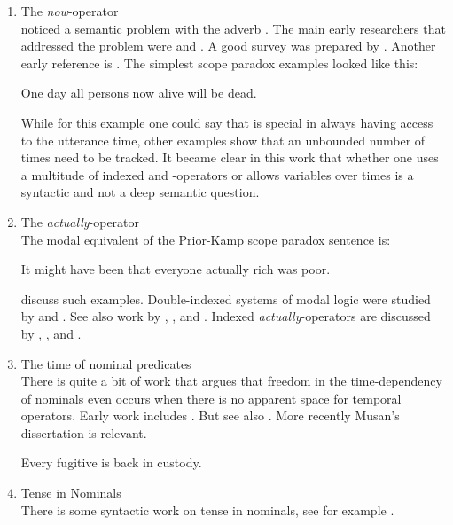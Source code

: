 \begin{enumerate}
  
  \item The \emph{now}-operator\\[6pt]
  \citet{prior:now} noticed a semantic problem with the adverb . The main early researchers that addressed the problem were \citet{kamp:now} and \citet{vlach:diss}. A good survey was prepared by \citet{vanbenthem:tenselogic}. Another early reference is \citet{saarinen:backward}. The simplest scope paradox examples looked like this:
  
  \ex One day all persons now alive will be dead. \xe
  
  While for this example one could say that  is special in always having access to the utterance time, other examples show that an unbounded number of times need to be tracked. It became clear in this work that whether one uses a multitude of indexed  and -operators or allows variables over times is a syntactic and not a deep semantic question.
  
  \medskip\item The \emph{actually}-operator\\[6pt]
  The modal equivalent of the Prior-Kamp scope paradox sentence is:
  
  \ex It might have been that everyone actually rich was poor. \xe
  
  \citet{crossley-humberstone} discuss such examples. Double-indexed systems of modal logic were studied by \citet{segerberg} and \citet{aqvist:1973:modal}. See also work by \citet{lewis:anselm}, \citet{vaninwagen:actuality}, and \citet{hazen:actuality}. Indexed \emph{actually}-operators are discussed by \citet{prior-fine}, \citet{peacocke:necessity}, and \citet{forbes:physicalism,forbes:metaphysics,forbes:possibility}.
  
  \medskip\item The time of nominal predicates\\[6pt]
  There is quite a bit of work that argues that freedom in the time-dependency of nominals even occurs when there is no apparent space for temporal operators. Early work includes \citet{enc:diss, enc:L&P:86}. But see also \citet{ejerhed:tense}. More recently Musan's dissertation \citep{musan:diss} is relevant.
  
  \ex Every fugitive is back in custody. \xe
  
  \medskip\item Tense in Nominals\\[6pt]
  There is some syntactic work on tense in nominals, see for example \citet{wiltschko:tenseond}.
  

\end{enumerate}
